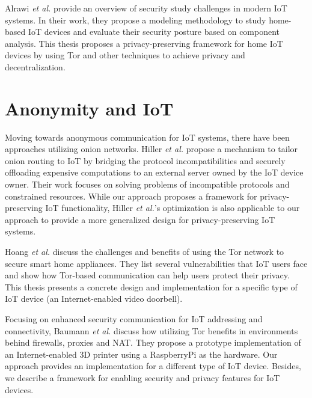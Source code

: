 Alrawi \textit{et al.} \cite{alrawi2019sok} provide an overview of security study challenges in modern IoT systems. In their work, they propose a modeling methodology to study home-based IoT devices and evaluate their security posture based on component analysis. This thesis proposes a privacy-preserving framework for home IoT devices by using Tor and other techniques to achieve privacy and decentralization. 



\section{Anonymity and IoT}

Moving towards anonymous communication for IoT systems, there have been approaches utilizing onion networks. Hiller \textit{et al.} \cite{hiller2019tailoring} propose a mechanism to tailor onion routing to IoT by bridging the protocol incompatibilities and securely offloading expensive computations to an external server owned by the IoT device owner. Their work focuses on solving problems of incompatible protocols and constrained resources. While our approach proposes a framework for privacy-preserving IoT functionality, Hiller \textit{et al.}'s optimization is also applicable to our approach to provide a more generalized design for privacy-preserving IoT systems.

Hoang \textit{et al.} \cite{hoang2015tor} discuss the challenges and benefits of using the Tor network to secure smart home appliances. They list several  vulnerabilities that IoT users face and show how Tor-based communication can help users protect their privacy. This thesis presents a concrete design and implementation for a specific type of IoT device (an Internet-enabled video doorbell).

Focusing on enhanced security communication for IoT addressing and connectivity, Baumann \textit{et al.} \cite{baumann2018utilising} discuss how utilizing Tor benefits in environments behind firewalls, proxies and NAT. They propose a prototype implementation of an Internet-enabled 3D printer using a RaspberryPi as the hardware. Our approach provides an implementation for a different type of IoT device. Besides, we describe a framework for enabling security and privacy features for IoT devices.
